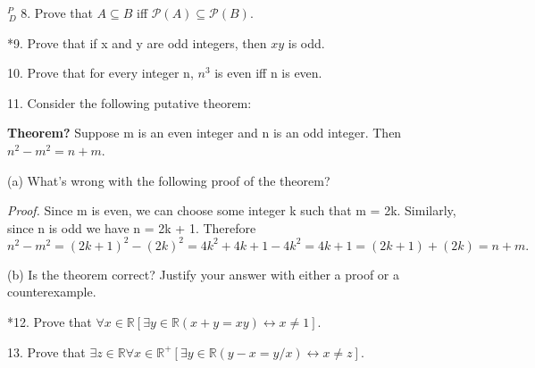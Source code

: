 \documentclass{article}
\begin{document}
\vspace{30pt}

$^{\textit{P}}_{\, \textit{D}}$ 8. Prove that $A \subseteq B$ iff $\mathcal{P} (A) \subseteq \mathcal{P} (B)$.
\vspace{30pt}



\vspace{30pt}

*9. Prove that if x and y are odd integers, then $x y$ is odd.
\vspace{30pt}



\vspace{30pt}

10. Prove that for every integer n, $n^3$ is even iff n is even.
\vspace{30pt}



\vspace{30pt}

11. Consider the following putative theorem:

\textbf{Theorem?} Suppose m is an even integer and n is an odd integer. Then
$n^2 - m^2 = n + m$.

\hspace{12pt}(a) What's wrong with the following proof of the theorem?

\textit{Proof.} Since m is even, we can choose some integer k such that
m = 2k. Similarly, since n is odd we have n = 2k + 1. Therefore
$$n^2 - m^2 = (2k + 1)^2 - (2k)^2 = 4k^2 + 4k + 1 - 4k^2 = 4k + 1
= (2k + 1) + (2k) = n + m.$$

\hspace{12pt}(b) Is the theorem correct? Justify your answer with either a proof or a
counterexample.
\vspace{30pt}



\vspace{30pt}

*12. Prove that $\forall x \in \mathbb{R}[\exists y \in \mathbb{R}(x + y = x y) \leftrightarrow x \neq 1]$.
\vspace{30pt}



\vspace{30pt}

13. Prove that $\exists z \in \mathbb{R} \forall x \in \mathbb{R}^+[\exists y \in \mathbb{R}(y - x = y/x) \leftrightarrow x \neq z]$.
\vspace{30pt}
\end{document}
